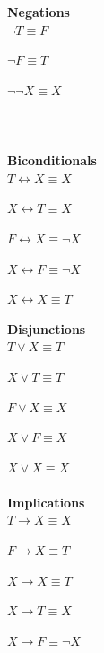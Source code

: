 \documentclass[12pt]{article}
\newenvironment{problem}[2][Problem]{\begin{trivlist}
\item[\hskip \labelsep {\bfseries #1}\hskip \labelsep {\bfseries #2.}]}{\end{trivlist}}
\begin{document}
\begin{problem}{2}
\begin{enumerate}[label=\Alph*.]
\begin{minipage}[t]{0.33\textwidth}
\vspace{0pt}
\textbf{Negations} \\

$\neg T \equiv F$

$\neg F \equiv T$

$\neg \neg X \equiv X$ \\ \\ \\ \\

\textbf{Biconditionals} \\

$T \leftrightarrow X \equiv  X $

$X \leftrightarrow T \equiv  X $

$F \leftrightarrow X \equiv \neg X $

$X \leftrightarrow F \equiv \neg X $

$X \leftrightarrow X \equiv T $
 




\end{minipage}
\begin{minipage}[t]{0.33\textwidth}
\vspace{0pt}

\textbf{Disjunctions} \\


$T \lor X \equiv T$

$X \lor T \equiv T$

$F \lor X \equiv X$

$X \lor F \equiv X$

$X \lor X \equiv X$ \\ \\


\textbf{Implications} \\

$T \rightarrow X \equiv  X$

$F \rightarrow X \equiv  T$

$X \rightarrow X \equiv  T$

$X \rightarrow T \equiv  X$

$X \rightarrow F \equiv \neg X $



\end{minipage}
\begin{minipage}[t]{0.33\textwidth}
\vspace{0pt}


\end{minipage}
\end{enumerate}
\end{problem}
\end{document}
